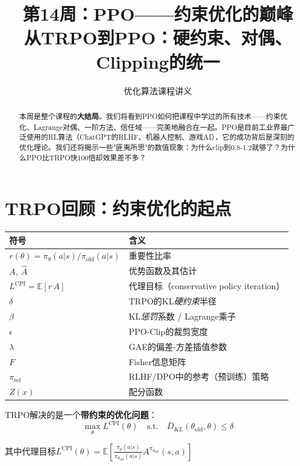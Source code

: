 \documentclass[11pt,a4paper]{article}
\title{\textbf{第14周：PPO——约束优化的巅峰} \\[0.5em]
\large 从TRPO到PPO：硬约束、对偶、Clipping的统一}
\author{优化算法课程讲义}
\date{}
\theoremstyle{definition}
\begin{document}
\maketitle

\begin{abstract}
本周是整个课程的\textbf{大结局}。我们将看到PPO如何把课程中学过的所有技术——约束优化、Lagrange对偶、一阶方法、信任域——完美地融合在一起。PPO是目前工业界最广泛使用的RL算法（ChatGPT的RLHF、机器人控制、游戏AI），它的成功背后是深刻的优化理论。我们还将揭示一些"匪夷所思"的数值现象：为什么clip到0.8-1.2就够了？为什么PPO比TRPO快100倍却效果差不多？
\end{abstract}

\tableofcontents
\newpage

\section{TRPO回顾：约束优化的起点}

\begin{keypoint}
\begin{center}
\begin{tabular}{ll}
\toprule
符号 & 含义 \\
\midrule
$r(\theta)=\pi_\theta(a|s)/\pi_{\text{old}}(a|s)$ & 重要性比率 \\
$A,\ \hat{A}$ & 优势函数及其估计 \\
$L^{\text{CPI}}=\mathbb{E}[r\,A]$ & 代理目标（conservative policy iteration） \\
$\delta$ & TRPO的KL\emph{硬约束}半径 \\
$\beta$ & KL\emph{惩罚}系数 / Lagrange乘子 \\
$\epsilon$ & PPO-Clip的裁剪宽度 \\
$\lambda$ & GAE的偏差-方差插值参数 \\
$F$ & Fisher信息矩阵 \\
$\pi_{\text{ref}}$ & RLHF/DPO中的参考（预训练）策略 \\
$Z(x)$ & 配分函数 \\
\bottomrule
\end{tabular}
\end{center}
\end{keypoint}

\begin{plainwords}[上周的核心结论]
TRPO解决的是一个\textbf{带约束的优化问题}：
\[
\max_\theta L^{\text{CPI}}(\theta) \quad \text{s.t.} \quad \bar{D}_{KL}(\theta_{\text{old}}, \theta) \leq \delta
\]

其中代理目标$L^{\text{CPI}}(\theta) = \mathbb{E}\left[\frac{\pi_\theta(a|s)}{\pi_{\theta_{\text{old}}}(a|s)} A^{\pi_{\theta_{\text{old}}}}(s,a)\right]$
\end{plainwords}
\end{document}
